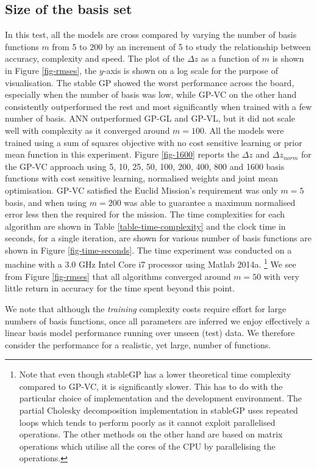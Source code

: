 \documentclass[useAMS,usenatbib,fleqn]{mn2e}
\begin{document}
\subsection{Size of the basis set}
In this test, all the models are cross compared by varying the number of basis functions $m$ from 5 to 200 by an increment of 5 to study the relationship between accuracy, complexity and speed. The plot of the $\Delta z$ as a function of $m$ is shown in Figure \ref{fig-rmses}, the $y$-axis is shown on a log scale for the purpose of visualisation. The stable GP showed the worst performance across the board, especially when the number of basis was low, while GP-VC on the other hand consistently outperformed the rest and most significantly when trained with a few number of basis. ANN outperformed GP-GL and GP-VL, but it did not scale well with complexity as it converged around $m=100$. All the models were trained using a sum of squares objective with no cost sensitive learning or prior mean function in this experiment. Figure \ref{fig-1600} reports the $\Delta z$ and $\Delta z_{norm}$ for the GP-VC approach using 5, 10, 25, 50, 100, 200, 400, 800 and 1600 basis functions with cost sensitive learning, normalised weights and joint mean optimisation. GP-VC satisfied the Euclid Mission's requirement was only $m=5$ basis, and when using $m=200$ was able to guarantee  a maximum normalised error less then the required for the mission. The  time complexities for each algorithm are shown in Table \ref{table-time-complexity} and the clock time in seconds, for a single iteration, are shown for various number of basis functions are shown in Figure \ref{fig-time-seconds}. The time experiment was conducted on a machine with a 3.0 GHz Intel Core i7 processor using Matlab 2014a. \footnote{Note that even though stableGP has a lower theoretical time complexity compared to GP-VC, it is significantly slower. This has to do with the particular choice of implementation and the development environment. The partial Cholesky decomposition implementation in stableGP \citep{stableGP} uses repeated loops which tends to perform poorly as it cannot exploit parallelised operations. The other methods on the other hand are based on matrix operations which utilise all the cores of the CPU by parallelising the operations.} We see from Figure \ref{fig-rmses} that all algorithms converged around $m=50$ with very little return in accuracy for the time spent beyond this point.

We note that although the \emph{training} complexity costs require effort for large numbers of basis functions, once all parameters are inferred we enjoy effectively a linear basis model performance running over unseen (test) data. We therefore consider the performance for a realistic, yet large, number of functions. 
\end{document}
